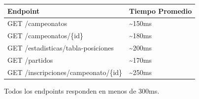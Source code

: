 \documentclass[
  spanish,
  11pt,
  letterpaper,
]{book}
\begin{document}
\begin{longtable}[]{@{}ll@{}}
\toprule\noalign{}
Endpoint & Tiempo Promedio \\
\midrule\noalign{}
\endhead
\bottomrule\noalign{}
\endlastfoot
GET /campeonatos & \textasciitilde150ms \\
GET /campeonatos/\{id\} & \textasciitilde180ms \\
GET /estadisticas/tabla-posiciones & \textasciitilde200ms \\
GET /partidos & \textasciitilde170ms \\
GET /inscripciones/campeonato/\{id\} & \textasciitilde250ms \\
\end{longtable}

Todos los endpoints responden en menos de 300ms.


\backmatter
\end{document}
